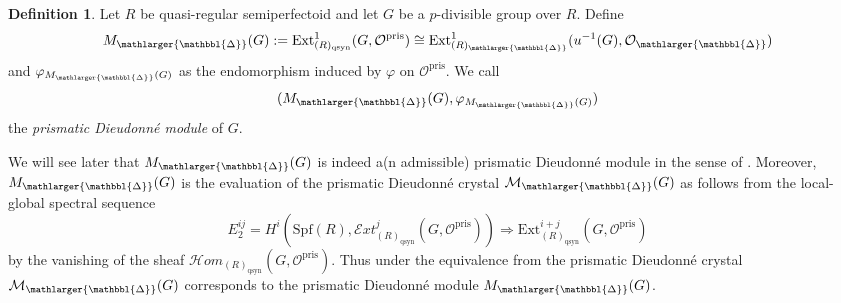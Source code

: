 \documentclass{amsart}
\newcommand{\prism}{{\mathlarger{\mathbbl{\Delta}}}}
\theoremstyle{plain}
\theoremstyle{definition}
\newtheorem{definition}[theorem]{Definition}
\newcommand{\pris}{\mathrm{pris}}
\newcommand{\Spf}{\mathrm{Spf}}
\newcommand{\red}[1]{{\color{black} #1}}
\begin{document}
\begin{definition}
  \label{sec:divid-prism-dieud-definition-divided-prismatic-dieudonne-module}
  Let $R$ be quasi-regular semiperfectoid and let $G$ be a $p$-divisible group over $R$. Define
  $$
     M_{\prism}(G):=\mathrm{Ext}^1_{(R)_{\mathrm{qsyn}}}(G,\mathcal{O}^\pris)\cong \mathrm{Ext}^1_{(R)_\prism}(u^{-1}(G),\mathcal{O}_\prism)
       $$
  and $\varphi_{M_\prism(G)}$ as the endomorphism induced by $\varphi$ on $\mathcal{O}^\pris$. We call
  $$
  (M_{\prism}(G),\varphi_{M_\prism(G)})
  $$
  the \textit{prismatic Dieudonn\'e module} of $G$.
\end{definition}

We will see later that $M_{\prism}(G)$ is indeed \red{a(n admissible) prismatic Dieudonn\'e module} in the sense of .
Moreover, $M_{\prism}(G)$ is the evaluation of the prismatic Dieudonn\'e crystal $\mathcal{M}_\prism(G)$ as follows from the local-global spectral sequence
$$
E^{ij}_2=H^i(\Spf(R),\mathcal{E}xt^j_{(R)_\mathrm{qsyn}}(G,\mathcal{O}^\pris))\Rightarrow \mathrm{Ext}^{i+j}_{(R)_\mathrm{qsyn}}(G,\mathcal{O}^\pris)
$$
by the vanishing of the sheaf $\mathcal{H}om_{(R)_\mathrm{qsyn}}(G,\mathcal{O}^\pris)$.
Thus under the equivalence from  the prismatic Dieudonn\'e crystal $\mathcal{M}_\prism(G)$ corresponds to the prismatic Dieudonn\'e module $M_\prism(G)$.
\end{document}
